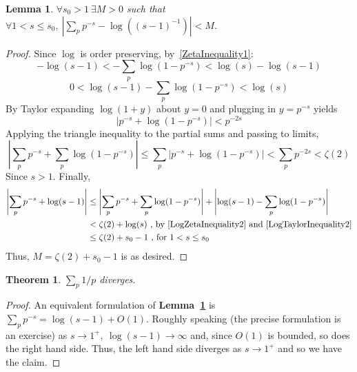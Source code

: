 \documentclass[12pt]{article}
\newcommand{\lref}[1]{\textbf{Lemma~\ref{#1}}}
\newtheorem{thm}{Theorem}
\newtheorem{lemma}{Lemma}
\numberwithin{equation}{section}
\numberwithin{thm}{section}
\numberwithin{lemma}{section}
\begin{document}
\begin{lemma}\label{SumOfPrimesEstimate}
  $\forall s_0 > 1 \ \exists M > 0$ such that $\forall 1 < s \leq s_0 , \ \left| \sum_p p^{-s} - \log((s - 1)^{-1}) \right| < M$.
\end{lemma}
\begin{proof}
  Since $\log$ is order preserving, by~\eqref{ZetaInequality1}: \begin{equation}\label{LogZetaInequality1}
    -\log(s - 1) < -\sum_p \log(1 - p^{-s}) < \log(s) - \log(s - 1)
  \end{equation} \begin{equation}\label{LogZetaInequality2}
    0 < \log(s - 1) - \sum_p \log (1 - p^{-s}) < \log(s)
  \end{equation} By Taylor expanding $\log (1 + y)$ about $y = 0$ and plugging in $y = p^{-s}$ yields \begin{equation}\label{LogTaylorInequality1}
    \left| p^{-s} + \log(1 - p^{-s}) \right| < p^{-2s}
  \end{equation} Applying the triangle inequality to the partial sums and passing to limits, \begin{equation}\label{LogTaylorInequality2}
    \left| \sum_p p^{-s} + \sum_p \log (1 - p^{-s}) \right| \leq \sum_p |p^{-s} + \log(1 - p^{-s})| < \sum_p p^{-2s} < \zeta(2)
  \end{equation} Since $s > 1$. Finally, \begin{align*}
    \left| \sum_p p^{-s} + \log (s - 1) \right| &\leq \left| \sum_p p^{-s} + \sum_p \log(1 - p^{-s}) \right| + \left| \log(s - 1) - \sum_p \log(1 - p^{-s}) \right| \\
    &< \zeta(2) + \log(s) \text{ , by } \eqref{LogZetaInequality2} \text{ and } \eqref{LogTaylorInequality2} \\
    &\leq \zeta(2) + s_0 - 1 \text{ , for } 1 < s \leq s_0
  \end{align*} Thus, $M = \zeta(2) + s_0 - 1$ is as desired.
\end{proof}

\begin{thm}\label{SumOfPrimesTheorem}
  $\sum_p 1/p$ diverges.
\end{thm}
\begin{proof}
  An equivalent formulation of \lref{SumOfPrimesEstimate} is $\sum_p p^{-s} = \log(s - 1) + O(1)$. Roughly speaking (the precise formulation is an exercise) as $s \to 1^+, \ \log(s - 1) \to \infty$ and, since $O(1)$ is bounded, so does the right hand side. Thus, the left hand side diverges as $s \to 1^+$ and so we have the claim.
\end{proof}
\end{document}
